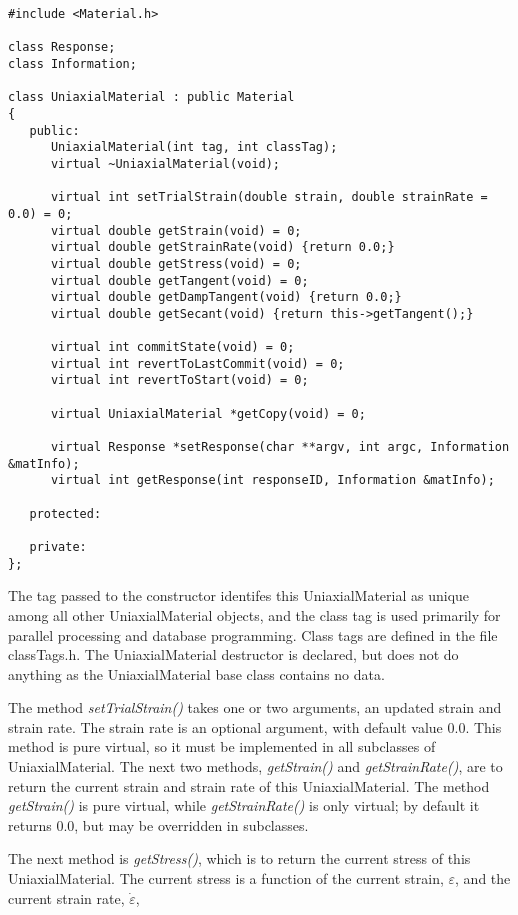 \documentclass[12pt]{article}
\begin{document}
{\sf\small
\begin{verbatim}
#include <Material.h>

class Response;
class Information;

class UniaxialMaterial : public Material
{
   public:
      UniaxialMaterial(int tag, int classTag);    
      virtual ~UniaxialMaterial(void);

      virtual int setTrialStrain(double strain, double strainRate = 0.0) = 0;
      virtual double getStrain(void) = 0;
      virtual double getStrainRate(void) {return 0.0;}
      virtual double getStress(void) = 0;
      virtual double getTangent(void) = 0;
      virtual double getDampTangent(void) {return 0.0;}
      virtual double getSecant(void) {return this->getTangent();}

      virtual int commitState(void) = 0;
      virtual int revertToLastCommit(void) = 0;    
      virtual int revertToStart(void) = 0;        

      virtual UniaxialMaterial *getCopy(void) = 0;

      virtual Response *setResponse(char **argv, int argc, Information &matInfo);
      virtual int getResponse(int responseID, Information &matInfo);    

   protected:
    
   private:
};
\end{verbatim}
}

The tag passed to the constructor identifes this UniaxialMaterial
as unique among all other UniaxialMaterial objects, and the class tag is used primarily for
parallel processing and database programming. Class tags are defined in the file classTags.h.
The UniaxialMaterial destructor is declared, but does not do anything as the UniaxialMaterial
base class contains no data.

The method {\em setTrialStrain()} takes one or two arguments, an updated strain
and strain rate. The strain rate is an optional argument, with default value $0.0$. This
method is pure virtual, so it must be implemented in all subclasses of UniaxialMaterial.
The next two methods, {\em getStrain()} and {\em getStrainRate()}, are to return the current
strain and strain rate of this UniaxialMaterial. The method {\em getStrain()} is pure
virtual, while {\em getStrainRate()} is only virtual; by default it returns $0.0$, but
may be overridden in subclasses.

The next method is {\em getStress()}, which is to return the current stress of this
UniaxialMaterial. The current stress is a function of the current strain, $\varepsilon$, and
the current strain rate, $\dot{\varepsilon}$,
\end{document}

